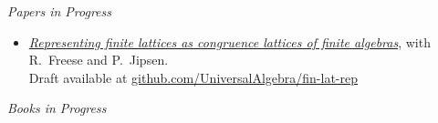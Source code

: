    {\it Papers in Progress}
    \begin{itemize}


    \item[] \href{https://github.com/UniversalAlgebra/fin-lat-rep}
           {{\it Representing finite lattices as congruence lattices of finite algebras}},
           with R.~Freese and P.~Jipsen. \\
           {\small Draft available at} \href{https://github.com/UniversalAlgebra/fin-lat-rep}{{\small github.com/UniversalAlgebra/fin-lat-rep}}
\end{itemize}
\vskip-3mm

    {\it Books in Progress}






